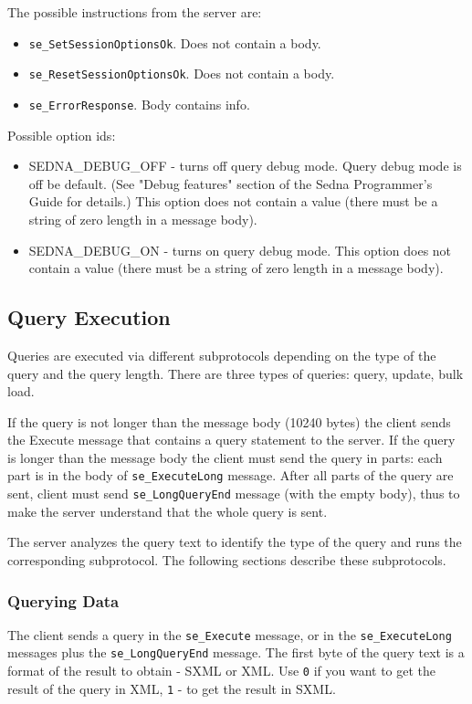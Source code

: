 \documentclass[a4paper,12pt]{article}
\begin{document}
The possible instructions from the server are:
\begin{itemize}
\item \verb!se_SetSessionOptionsOk!. Does not contain a body.
\item \verb!se_ResetSessionOptionsOk!. Does not contain a body.
\item \verb!se_ErrorResponse!. Body contains info.
\end{itemize}

Possible option ids:
\begin{itemize}
\item SEDNA\_DEBUG\_OFF - turns off query debug mode. Query debug mode is off be default. (See "Debug features" section of the Sedna Programmer's Guide for details.) This option does not contain a value (there must be a string of zero length in a message body).
\item SEDNA\_DEBUG\_ON - turns on query debug mode. This option does not contain a value (there must be a string of zero length in a message body).
\end{itemize}

\subsection{Query Execution}

Queries are executed via different subprotocols depending on the type of the query and the query length. There are three types of queries: query, update, bulk load.

If the query is not longer than the message body (10240 bytes) the client sends the Execute message that contains a query statement to the server.
If the query is longer than the message body the client must send the query in parts: each part is in the body of \verb!se_ExecuteLong! message. After all parts of the query are sent, client must send \verb!se_LongQueryEnd! message (with the empty body), thus to make the server understand that the whole query is sent.


The server analyzes the query text to identify the type of the query and runs the corresponding subprotocol. The following sections describe these subprotocols.

\subsubsection{Querying Data }

The client sends a query in the \verb!se_Execute! message, or in the \verb!se_ExecuteLong! messages plus the \verb!se_LongQueryEnd! message. The first byte of the query text is a format of the result to obtain - SXML \cite{paper:sxml} or XML. Use \verb!0! if you want to get the result of the query in XML, \verb!1! - to get the result in SXML.
\end{document}
